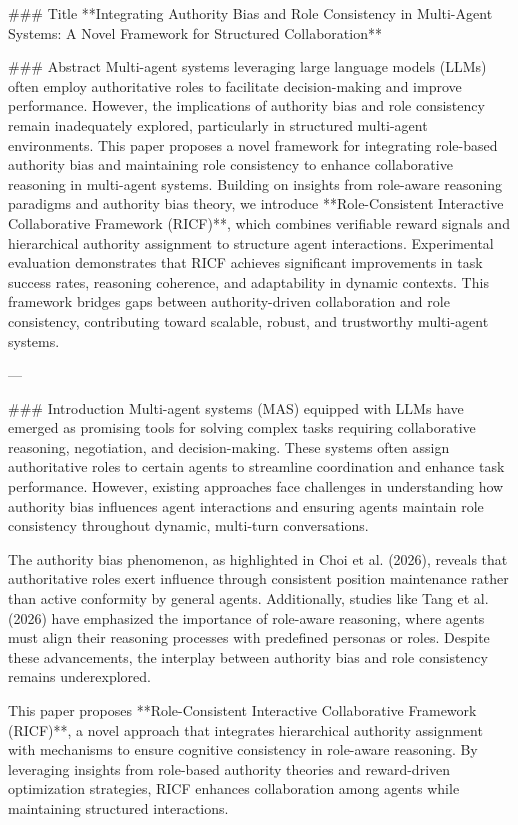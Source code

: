 ### Title
**Integrating Authority Bias and Role Consistency in Multi-Agent Systems: A Novel Framework for Structured Collaboration**

### Abstract
Multi-agent systems leveraging large language models (LLMs) often employ authoritative roles to facilitate decision-making and improve performance. However, the implications of authority bias and role consistency remain inadequately explored, particularly in structured multi-agent environments. This paper proposes a novel framework for integrating role-based authority bias and maintaining role consistency to enhance collaborative reasoning in multi-agent systems. Building on insights from role-aware reasoning paradigms and authority bias theory, we introduce **Role-Consistent Interactive Collaborative Framework (RICF)**, which combines verifiable reward signals and hierarchical authority assignment to structure agent interactions. Experimental evaluation demonstrates that RICF achieves significant improvements in task success rates, reasoning coherence, and adaptability in dynamic contexts. This framework bridges gaps between authority-driven collaboration and role consistency, contributing toward scalable, robust, and trustworthy multi-agent systems.

---

### Introduction
Multi-agent systems (MAS) equipped with LLMs have emerged as promising tools for solving complex tasks requiring collaborative reasoning, negotiation, and decision-making. These systems often assign authoritative roles to certain agents to streamline coordination and enhance task performance. However, existing approaches face challenges in understanding how authority bias influences agent interactions and ensuring agents maintain role consistency throughout dynamic, multi-turn conversations.

The authority bias phenomenon, as highlighted in Choi et al. (2026), reveals that authoritative roles exert influence through consistent position maintenance rather than active conformity by general agents. Additionally, studies like Tang et al. (2026) have emphasized the importance of role-aware reasoning, where agents must align their reasoning processes with predefined personas or roles. Despite these advancements, the interplay between authority bias and role consistency remains underexplored.

This paper proposes **Role-Consistent Interactive Collaborative Framework (RICF)**, a novel approach that integrates hierarchical authority assignment with mechanisms to ensure cognitive consistency in role-aware reasoning. By leveraging insights from role-based authority theories and reward-driven optimization strategies, RICF enhances collaboration among agents while maintaining structured interactions.

